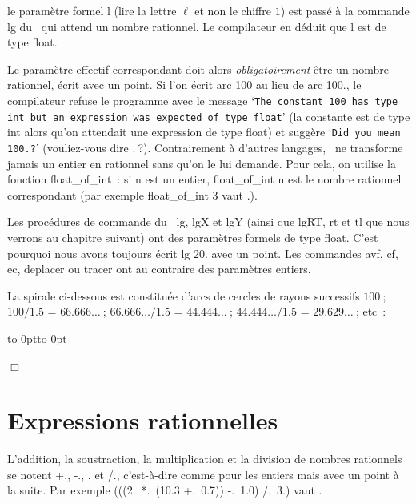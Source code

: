 \noindent le paramètre formel {\idt l} (lire la lettre $\ell$ et non le chiffre $1$) est passé à la commande {\idt lg} du \robot\ qui
attend un nombre rationnel. Le compilateur en déduit que {\idt l} est de type {\idt float}.

Le paramètre effectif correspondant doit alors {\em obligatoirement} être un nombre
rationnel, écrit avec un point. Si l'on écrit {\idt arc 100} au lieu de {\idt arc 100.},
le compilateur refuse le programme avec le message
`{\tt The constant 100 has type int but an expression was expected of type float}'
(la constante {} est de type {\idt int} alors qu'on attendait une expression de
type {\idt float}) et suggère `{\tt Did you mean 100.?}' (vouliez-vous dire {.}$\:$?).
Contrairement à d'autres langages, \ocaml\ ne transforme jamais un entier en rationnel
sans qu'on le lui demande. Pour cela, on utilise la fonction
{\idt float\_of\_int}~: si {\idt n} est un entier,
{\idt float\_of\_int n} est le nombre rationnel correspondant (par exemple
{\idt float\_of\_int 3} vaut {.}).

Les procédures de commande du \robot\ {\idt lg}, {\idt lgX} et {\idt lgY} (ainsi que
{\idt lgRT}, {\idt rt} et {\idt tl} que nous verrons au chapitre suivant) ont des paramètres
formels de type {\idt float}. C'est pourquoi nous avons toujours écrit {\idt lg 20.} avec un
point. Les commandes {\idt avf}, {\idt cf}, {\idt ec}, {\idt deplacer} ou {\idt tracer}
ont au contraire des paramètres entiers.

\begin{exemple}{\rm
La spirale ci-dessous est constituée d'arcs de cercles de rayons successifs
$100$$\:$; $100 / 1.5$ = $66.666\ldots$$\:$; $66.666\ldots / 1.5$ = $44.444\ldots$$\:$;
$44.444\ldots / 1.5$ = $29.629\ldots$$\:$; etc~:

 {\raggedright
 \hbox to 0pt{\hspace*{2cm}\vbox to 0pt{}}
 
 }
\noindent $\Box$ }\end{exemple}

\section{Expressions rationnelles}
L'addition, la soustraction, la multiplication et la division de nombres rationnels se
notent {\idt +.}, {\idt -.}, {\idt *.} et {\idt /.}, c'est-à-dire comme pour les entiers mais
avec un point à la suite. Par exemple
{\idt (((2.\ *.\ (10.3 +.\ 0.7)) -.\ 1.0) /.\ 3.)} vaut {.}

